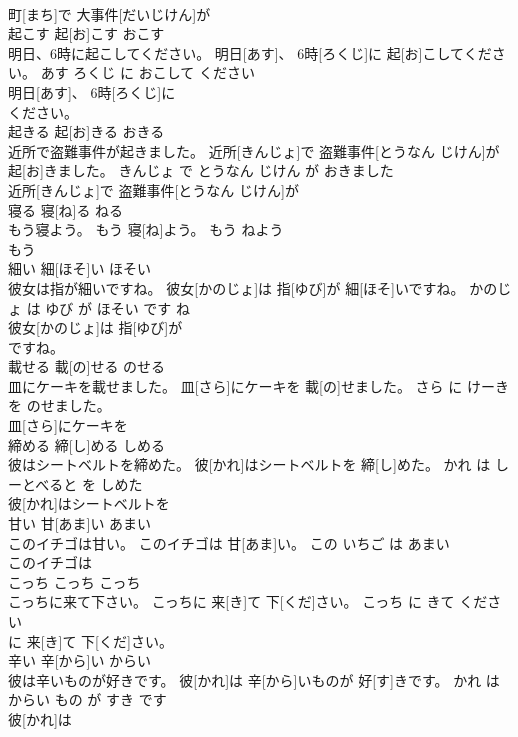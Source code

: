 \documentclass[8pt]{extreport}
\begin{document}
\begin{CJK}{UTF8}{min}
\\	町[まち]で 大事件[だいじけん]が
\\	起こす	起[お]こす	おこす	
\\	明日、6時に起こしてください。	明日[あす]、 6時[ろくじ]に 起[お]こしてください。	あす ろくじ に おこして ください	
\\	明日[あす]、 6時[ろくじ]に
\\	ください。		
\\	起きる	起[お]きる	おきる	
\\	近所で盗難事件が起きました。	近所[きんじょ]で 盗難事件[とうなん じけん]が 起[お]きました。	きんじょ で とうなん じけん が おきました	
\\	近所[きんじょ]で 盗難事件[とうなん じけん]が
\\	寝る	寝[ね]る	ねる	
\\	もう寝よう。	もう 寝[ね]よう。	もう ねよう	
\\	もう
\\	細い	細[ほそ]い	ほそい	
\\	彼女は指が細いですね。	彼女[かのじょ]は 指[ゆび]が 細[ほそ]いですね。	かのじょ は ゆび が ほそい です ね	
\\	彼女[かのじょ]は 指[ゆび]が
\\	ですね。		
\\	載せる	載[の]せる	のせる	
\\	皿にケーキを載せました。	皿[さら]にケーキを 載[の]せました。	さら に けーき を のせました。	
\\	皿[さら]にケーキを
\\	締める	締[し]める	しめる	
\\	彼はシートベルトを締めた。	彼[かれ]はシートベルトを 締[し]めた。	かれ は しーとべると を しめた	
\\	彼[かれ]はシートベルトを
\\	甘い	甘[あま]い	あまい	
\\	このイチゴは甘い。	このイチゴは 甘[あま]い。	この いちご は あまい	
\\	このイチゴは
\\	こっち	こっち	こっち	
\\	こっちに来て下さい。	こっちに 来[き]て 下[くだ]さい。	こっち に きて ください	
\\	に 来[き]て 下[くだ]さい。		
\\	辛い	辛[から]い	からい	
\\	彼は辛いものが好きです。	彼[かれ]は 辛[から]いものが 好[す]きです。	かれ は からい もの が すき です	
\\	彼[かれ]は

\end{CJK}
\end{document}

